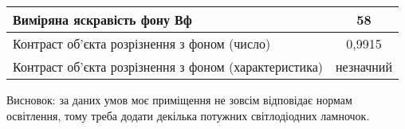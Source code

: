 \documentclass[a4paper,14pt]{extreport}
\begin{document}
\begin{landscape}
\begin{table}[h]
\begin{center}
\begin{tabular}{|l|c|c|c|c|}
        Виміряна яскравість фону  Вф                                                                                                               & \multicolumn{4}{c|}{58}                 \\ \hline
        Контраст об’єкта розрізнення з фоном (число)                                                                                               & \multicolumn{4}{c|}{0,9915}                 \\ \hline
        Контраст об’єкта розрізнення з фоном (характеристика)                                                                                      & \multicolumn{4}{c|}{незначний}                 \\ \hline
        \end{tabular}
         \end{center} 
    \end{table}
 
  

Висновок:  за даних умов моє приміщення не зовсім відповідає нормам освітлення, тому треба додати декілька потужних світлодіодних ламночок.
\end{landscape}
\end{document}
